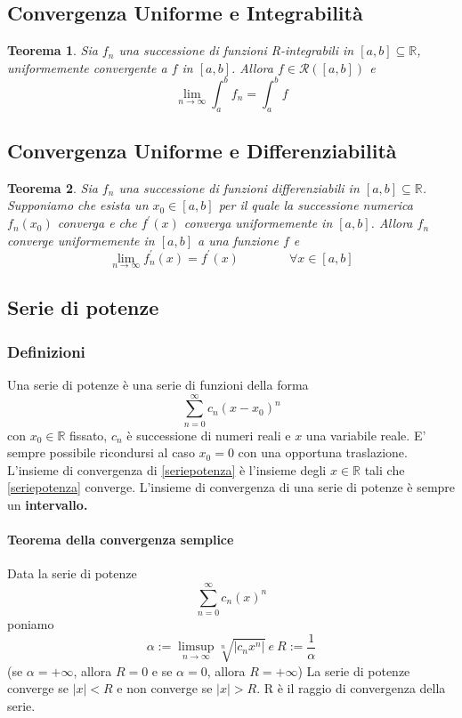 \documentclass[a4paper,12pt]{article}
\newcommand{\Rint}{\mathcal{R}}
\newtheorem{teo}{Teorema}
\begin{document}
\subsection{Convergenza Uniforme e Integrabilità}
\begin{teo}
Sia ${f_n}$ una successione di funzioni R-integrabili in $[a,b]\subseteq \mathbb{R}$, uniformemente convergente a $f$ in $[a,b]$. Allora $f\in \Rint([a,b])$ e
$$\lim_{n\to\infty}\int_{a}^{b} f_n=\int_{a}^{b}f$$
\end{teo}
\subsection{Convergenza Uniforme e Differenziabilità}
\begin{teo}
Sia $f_n$ una successione di funzioni differenziabili in  $[a,b]\subseteq \mathbb{R}$. Supponiamo che esista un $x_{0} \in [a,b] $ per il quale la successione numerica ${f_n(x_0)}$ converga e che ${f^{'}(x)}$ converga uniformemente in $[a,b]$. Allora ${f_n}$ converge uniformemente in $[a,b]$ a una funzione $f$ e
$$\lim_{n\to\infty} f^{'}_n (x)=f^{'}(x) \qquad \qquad \forall x \in [a,b]$$
\end{teo}

\subsection{Serie di potenze}
\subsubsection{Definizioni}
Una serie di potenze è una serie di funzioni della forma
$$\label{seriepotenza} \displaystyle \sum_{n=0}^\infty c_n\left(x-x_0\right)^n$$
con $x_0 \in \mathbb{R}$ fissato, ${c_n}$ è successione di numeri reali e $x$ una variabile reale. 
E' sempre possibile ricondursi al caso $x_0 = 0$ con una opportuna traslazione. L'insieme di convergenza di \ref{seriepotenza} è l'insieme degli $x \in \mathbb{R}$ tali che \ref{seriepotenza} converge. L'insieme di convergenza di una serie di potenze è sempre un \textbf{intervallo.}
\paragraph{Teorema della convergenza semplice}
Data la serie di potenze 
$$ \displaystyle \sum_{n=0}^\infty c_n\left(x\right)^n$$
poniamo $$ \alpha:=\limsup_{n\to \infty} \sqrt[n]{|c_n x^n|} \ e \ R:=\frac{1}{\alpha}$$
(se $\alpha = +\infty$, allora $R=0$ e se $\alpha=0$, allora $R=+\infty$)
La serie di potenze converge se $|x|<R$ e non converge se $|x|>R$.
R è il raggio di convergenza della serie.
\end{document}
